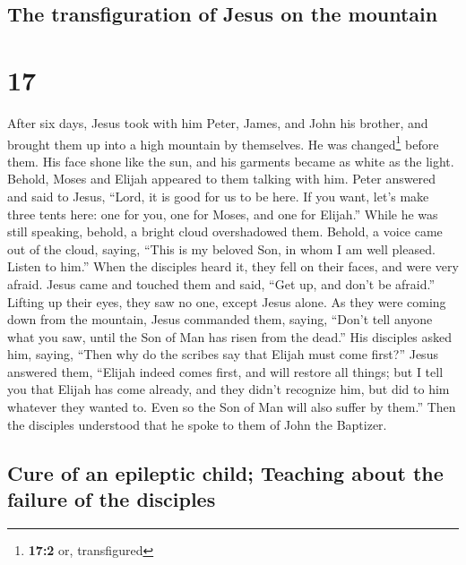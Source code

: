 \begin{paracol}{2}
\begin{otherlanguage}{english}
\hypertarget{the-transfiguration-of-jesus-on-the-mountain}{%
\subsection{The transfiguration of Jesus on the
mountain}\label{the-transfiguration-of-jesus-on-the-mountain}}

\hypertarget{section-33}{%
\section{17}\label{section-33}}

 After six days, Jesus took with him Peter, James, and
John his brother, and brought them up into a high mountain by
themselves.  He was changed\footnote{\textbf{17:2} or,
  transfigured} before them. His face shone like the sun, and his
garments became as white as the light.  Behold, Moses and
Elijah appeared to them talking with him.  Peter answered
and said to Jesus, ``Lord, it is good for us to be here. If you want,
let's make three tents here: one for you, one for Moses, and one for
Elijah.''  While he was still speaking, behold, a bright
cloud overshadowed them. Behold, a voice came out of the cloud, saying,
``This is my beloved Son, in whom I am well pleased. Listen to him.''
 When the disciples heard it, they fell on their faces,
and were very afraid.  Jesus came and touched them and
said, ``Get up, and don't be afraid.''  Lifting up their
eyes, they saw no one, except Jesus alone.  As they were
coming down from the mountain, Jesus commanded them, saying, ``Don't
tell anyone what you saw, until the Son of Man has risen from the
dead.''  His disciples asked him, saying, ``Then why do
the scribes say that Elijah must come first?''  Jesus
answered them, ``Elijah indeed comes first, and will restore all things;
 but I tell you that Elijah has come already, and they
didn't recognize him, but did to him whatever they wanted to. Even so
the Son of Man will also suffer by them.''  Then the
disciples understood that he spoke to them of John the Baptizer.

\hypertarget{cure-of-an-epileptic-child-teaching-about-the-failure-of-the-disciples}{%
\subsection{Cure of an epileptic child; Teaching about the failure of
the
disciples}\label{cure-of-an-epileptic-child-teaching-about-the-failure-of-the-disciples}}


\end{otherlanguage}
\end{paracol}
